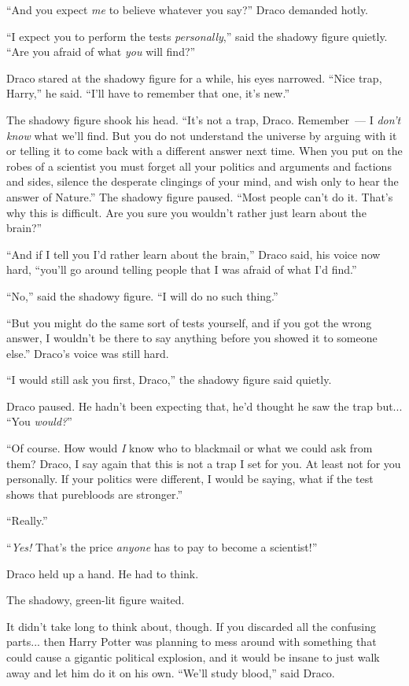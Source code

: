 ``And you expect \emph{me} to believe whatever you say?'' Draco demanded hotly.

``I expect you to perform the tests \emph{personally},'' said the shadowy figure quietly. ``Are you afraid of what \emph{you} will find?''

Draco stared at the shadowy figure for a while, his eyes narrowed. ``Nice trap, Harry,'' he said. ``I'll have to remember that one, it's new.''

The shadowy figure shook his head. ``It's not a trap, Draco. Remember~--- I \emph{don't know} what we'll find. But you do not understand the universe by arguing with it or telling it to come back with a different answer next time. When you put on the robes of a scientist you must forget all your politics and arguments and factions and sides, silence the desperate clingings of your mind, and wish only to hear the answer of Nature.'' The shadowy figure paused. ``Most people can't do it. That's why this is difficult. Are you sure you wouldn't rather just learn about the brain?''

``And if I tell you I'd rather learn about the brain,'' Draco said, his voice now hard, ``you'll go around telling people that I was afraid of what I'd find.''

``No,'' said the shadowy figure. ``I will do no such thing.''

``But you might do the same sort of tests yourself, and if you got the wrong answer, I wouldn't be there to say anything before you showed it to someone else.'' Draco's voice was still hard.

``I would still ask you first, Draco,'' the shadowy figure said quietly.

Draco paused. He hadn't been expecting that, he'd thought he saw the trap but... ``You \emph{would?}''

``Of course. How would \emph{I} know who to blackmail or what we could ask from them? Draco, I say again that this is not a trap I set for you. At least not for you personally. If your politics were different, I would be saying, what if the test shows that purebloods are stronger.''

``Really.''

``\emph{Yes!} That's the price \emph{anyone} has to pay to become a scientist!''

Draco held up a hand. He had to think.

The shadowy, green-lit figure waited.

It didn't take long to think about, though. If you discarded all the confusing parts... then Harry Potter was planning to mess around with something that could cause a gigantic political explosion, and it would be insane to just walk away and let him do it on his own. ``We'll study blood,'' said Draco.

